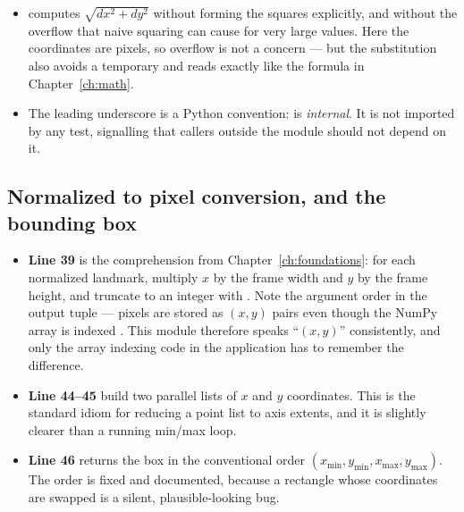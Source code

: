 \begin{codecard}

\end{codecard}

\begin{itemize}
  \item {} computes $\sqrt{dx^2 + dy^2}$ without forming the squares
        explicitly, and without the overflow that naive squaring can cause for very large values.
        Here the coordinates are pixels, so overflow is not a concern --- but the substitution also
        avoids a temporary and reads exactly like the formula in Chapter~\ref{ch:math}.
  \item The leading underscore is a Python convention:  is \emph{internal}. It is
        not imported by any test, signalling that callers outside the module should not depend on it.
\end{itemize}

\subsection{Normalized to pixel conversion, and the bounding box}

\begin{codecard}

\end{codecard}

\begin{itemize}
  \item \textbf{Line 39} is the comprehension from Chapter~\ref{ch:foundations}: for each normalized
        landmark, multiply $x$ by the frame width and $y$ by the frame height, and truncate to an
        integer with . Note the argument order  in the output tuple ---
        pixels are stored as $(x, y)$ pairs even though the NumPy array is indexed \code{[y, x]}.
        This module therefore speaks ``$(x, y)$'' consistently, and only the array indexing code in
        the application has to remember the difference.
  \item \textbf{Line 44--45} build two parallel lists of $x$ and $y$ coordinates. This is the
        standard idiom for reducing a point list to axis extents, and it is slightly clearer than a
        running min/max loop.
  \item \textbf{Line 46} returns the box in the conventional order
        $(x_{\min}, y_{\min}, x_{\max}, y_{\max})$. The order is fixed and documented, because a
        rectangle whose coordinates are swapped is a silent, plausible-looking bug.
\end{itemize}


